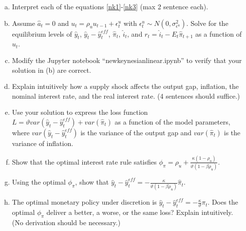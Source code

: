 \documentclass{article}
\newcommand{\1}{\mathbf{1}}
\begin{document}
\begin{enumerate}[(a)]
\item Interpret each of the equations \eqref{nk1}-\eqref{nk3} (max 2 sentence each).
\item Assume $\hat{a}_{t}=0$ and $u_{t}=\rho_u u_{t-1}+\epsilon_t^u$ with $\epsilon_t^u\sim N(0,\sigma^2_{\epsilon^u})$. Solve for the equilibrium levels of $\hat{y}_t$, $\hat{y}_t-\hat{y}_t^{eff}$, $\hat{\pi}_t$, $\hat{i}_t$, and $\hat{r}_{t}=\hat{i}_t-E_t\hat{\pi}_{t+1}$ as a function of $u_t$.
\item Modify the Jupyter notebook ``newkeynesianlinear.ipynb'' to verify that your solution in (b) are correct.
\item Explain intuitively how a supply shock affects the output gap, inflation, the nominal interest rate, and the real interest rate. (4 sentences should suffice.)
\item Use your solution to express the loss function $L=\vartheta var(\hat{y}_{t}-\hat{y}_{t}^{eff})+var(\hat{\pi}_t)$ as a function of the model parameters, where $var(\hat{y}_{t}-\hat{y}_{t}^{eff})$ is the variance of the output gap and $var(\hat{\pi}_t)$ is the variance of inflation.
\item Show that the optimal interest rate rule satisfies $\phi_\pi=\rho_u + \frac{\kappa (1-\rho_u)}{\vartheta(1-\beta\rho_u)}$.
\item Using the optimal $\phi_\pi$, show that $\hat{y}_{t}-\hat{y}_{t}^{eff}=-\frac{\kappa}{\vartheta(1-\beta\rho_u)}\hat{\pi}_t$.
\item The optimal monetary policy under discretion is $\hat{y}_{t}-\hat{y}_{t}^{eff}=-\frac{\kappa}{\vartheta}\hat{\pi}_t$. Does the optimal $\phi_\pi$ deliver a better, a worse, or the same loss? Explain intuitively. (No derivation should be necessary.)
\end{enumerate}
\end{document}
